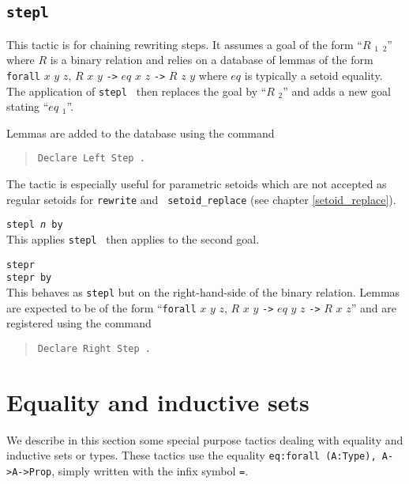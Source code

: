 \subsection[{\tt stepl {\term}}]{{\tt stepl {\term}}}

This tactic is for chaining rewriting steps. It assumes a goal of the
form ``$R$ {\term}$_1$ {\term}$_2$'' where $R$ is a binary relation
and relies on a database of lemmas of the form {\tt forall} $x$ $y$
$z$, $R$ $x$ $y$ {\tt ->} $eq$ $x$ $z$ {\tt ->} $R$ $z$ $y$ where $eq$
is typically a setoid equality. The application of {\tt stepl {\term}}
then replaces the goal by ``$R$ {\term} {\term}$_2$'' and adds a new
goal stating ``$eq$ {\term} {\term}$_1$''.

Lemmas are added to the database using the command 
\begin{quote}
{\tt Declare Left Step {\term}.}
\end{quote}

The tactic is especially useful for parametric setoids which are not
accepted as regular setoids for {\tt rewrite} and {\tt
  setoid\_replace} (see chapter \ref{setoid_replace}).

\begin{Variants}
\item{\tt stepl {\term}{\sl n} by {\tac}}\\
This applies {\tt stepl {\term}} then applies {\tac} to the second goal.

\item{\tt stepr {\term}}\\
     {\tt stepr {\term} by {\tac}}\\
This behaves as {\tt stepl} but on the right-hand-side of the binary relation.
Lemmas are expected to be of the form
``{\tt forall} $x$ $y$
$z$, $R$ $x$ $y$ {\tt ->} $eq$ $y$ $z$ {\tt ->} $R$ $x$ $z$''
and are registered using the command
\begin{quote}
{\tt Declare Right Step {\term}.}
\end{quote}
\end{Variants}

\section{Equality and inductive sets}

We describe in this section some special purpose tactics dealing with
equality and inductive sets or types. These tactics use the equality
{\tt eq:forall (A:Type), A->A->Prop}, simply written with the
infix symbol {\tt =}.


